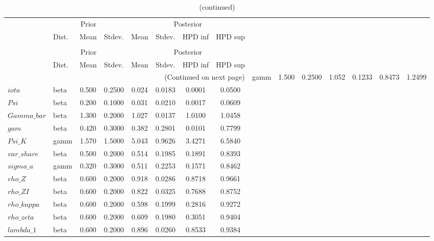  
\begin{center}
\begin{longtable}{llcccccc} 
\caption{Results from Metropolis-Hastings (parameters)}
 \label{Table:MHPosterior:1}\\
\toprule 
  & \multicolumn{3}{c}{Prior}  &  \multicolumn{4}{c}{Posterior} \\
  \cmidrule(r{.75em}){2-4} \cmidrule(r{.75em}){5-8}
  & Dist. & Mean  & Stdev. & Mean & Stdev. & HPD inf & HPD sup\\
\midrule \endfirsthead 
\caption{(continued)}\\\toprule 
  & \multicolumn{3}{c}{Prior}  &  \multicolumn{4}{c}{Posterior} \\
  \cmidrule(r{.75em}){2-4} \cmidrule(r{.75em}){5-8}
  & Dist. & Mean  & Stdev. & Mean & Stdev. & HPD inf & HPD sup\\
\midrule \endhead 
\bottomrule \multicolumn{8}{r}{(Continued on next page)} \endfoot 
\bottomrule \endlastfoot 
$sigma$ & gamm &   1.500 & 0.2500 &   1.052& 0.1233 &  0.8473 &  1.2499 \\ 
$iota$ & beta &   0.500 & 0.2500 &   0.024& 0.0183 &  0.0001 &  0.0500 \\ 
$Psi$ & beta &   0.200 & 0.1000 &   0.031& 0.0210 &  0.0017 &  0.0609 \\ 
$Gamma\_bar$ & beta &   1.300 & 0.2000 &   1.027& 0.0137 &  1.0100 &  1.0458 \\ 
$gam$ & beta &   0.420 & 0.3000 &   0.382& 0.2801 &  0.0101 &  0.7799 \\ 
$Psi\_K$ & gamm &   1.570 & 1.5000 &   5.043& 0.9626 &  3.4271 &  6.5840 \\ 
$var\_share$ & beta &   0.500 & 0.2000 &   0.514& 0.1985 &  0.1891 &  0.8393 \\ 
$sigma\_a$ & gamm &   0.320 & 0.3000 &   0.511& 0.2253 &  0.1571 &  0.8462 \\ 
$rho\_Z$ & beta &   0.600 & 0.2000 &   0.918& 0.0286 &  0.8718 &  0.9661 \\ 
$rho\_ZI$ & beta &   0.600 & 0.2000 &   0.822& 0.0325 &  0.7688 &  0.8752 \\ 
$rho\_kappa$ & beta &   0.600 & 0.2000 &   0.598& 0.1999 &  0.2816 &  0.9272 \\ 
$rho\_zeta$ & beta &   0.600 & 0.2000 &   0.609& 0.1980 &  0.3051 &  0.9404 \\ 
$lambda\_1$ & beta &   0.600 & 0.2000 &   0.896& 0.0260 &  0.8533 &  0.9384 \\ 
\end{longtable}
 \end{center}
